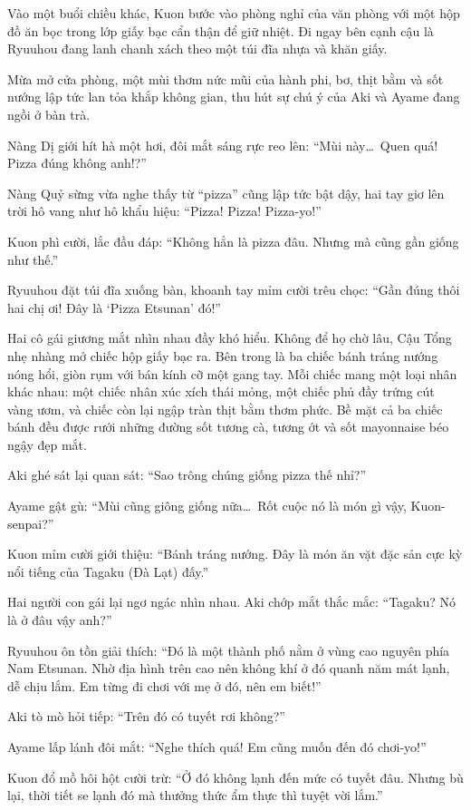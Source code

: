 \documentclass[../main.tex]{subfiles}
\begin{document}
Vào một buổi chiều khác, Kuon bước vào phòng nghỉ của văn phòng với một hộp đồ ăn bọc trong lớp giấy bạc cẩn thận để giữ nhiệt. Đi ngay bên cạnh cậu là Ryuuhou đang lanh chanh xách theo một túi đĩa nhựa và khăn giấy.

Mừa mở cửa phòng, một mùi thơm nức mũi của hành phi, bơ, thịt bằm và sốt nướng lập tức lan tỏa khắp không gian, thu hút sự chú ý của Aki và Ayame đang ngồi ở bàn trà.

Nàng Dị giới hít hà một hơi, đôi mắt sáng rực reo lên: ``Mùi này\dots\ Quen quá! Pizza đúng không anh!?''

Nàng Quỷ sừng vừa nghe thấy từ ``pizza'' cũng lập tức bật dậy, hai tay giơ lên trời hô vang như hô khẩu hiệu: ``Pizza! Pizza! Pizza-yo!''

Kuon phì cười, lắc đầu đáp: ``Không hẳn là pizza đâu. Nhưng mà cũng gần giống như thế.''

Ryuuhou đặt túi đĩa xuống bàn, khoanh tay mỉm cười trêu chọc: ``Gần đúng thôi hai chị ơi! Đây là `Pizza Etsunan' đó!''

Hai cô gái giương mắt nhìn nhau đầy khó hiểu. Không để họ chờ lâu, Cậu Tổng nhẹ nhàng mở chiếc hộp giấy bạc ra. Bên trong là ba chiếc bánh tráng nướng nóng hổi, giòn rụm với bán kính cỡ một gang tay. Mỗi chiếc mang một loại nhân khác nhau: một chiếc nhân xúc xích thái mỏng, một chiếc phủ đầy trứng cút vàng ươm, và chiếc còn lại ngập tràn thịt bằm thơm phức. Bề mặt cả ba chiếc bánh đều được rưới những đường sốt tương cà, tương ớt và sốt mayonnaise béo ngậy đẹp mắt.

Aki ghé sát lại quan sát: ``Sao trông chúng giống pizza thế nhỉ?''

Ayame gật gù: ``Mùi cũng giông giống nữa\dots\ Rốt cuộc nó là món gì vậy, Kuon-senpai?''

Kuon mỉm cười giới thiệu: ``Bánh tráng nướng. Đây là món ăn vặt đặc sản cực kỳ nổi tiếng của Tagaku (Đà Lạt) đấy.''

Hai người con gái lại ngơ ngác nhìn nhau. Aki chớp mắt thắc mắc: ``Tagaku? Nó là ở đâu vậy anh?''

Ryuuhou ôn tồn giải thích: ``Đó là một thành phố nằm ở vùng cao nguyên phía Nam Etsunan. Nhờ địa hình trên cao nên không khí ở đó quanh năm mát lạnh, dễ chịu lắm. Em từng đi chơi với mẹ ở đó, nên em biết!''

Aki tò mò hỏi tiếp: ``Trên đó có tuyết rơi không?''

Ayame lấp lánh đôi mắt: ``Nghe thích quá! Em cũng muốn đến đó chơi-yo!''

Kuon đổ mồ hôi hột cười trừ: ``Ở đó không lạnh đến mức có tuyết đâu. Nhưng bù lại, thời tiết se lạnh đó mà thưởng thức ẩm thực thì tuyệt vời lắm.''
\end{document}

